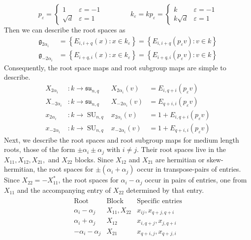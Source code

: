 \documentclass[12pt]{article}
\theoremstyle{definition}
\newcommand{\eps}{\varepsilon}
\newcommand{\lb}{\left\{}
\newcommand{\rb}{\right\}}
\newcommand{\frakg}{\mathfrak{g}}
\newcommand{\fraksu}{\mathfrak{su}}
\DeclareMathOperator{\SU}{SU}
\begin{document}
\[
	p_\eps =
	\begin{cases}
		1 & \eps = -1 \\
		\sqrt{d} & \eps = 1
	\end{cases}
	\qquad \qquad
	k_\eps = k p_\eps = 
	\begin{cases}
		k & \eps = -1 \\
		k \sqrt{d} & \eps = 1
	\end{cases} 
\]
Then we can describe the root spaces as
\begin{align*}
	\frakg_{2\alpha_i} &= \lb E_{i,i+q}(x) : x \in k_\eps \rb = \lb E_{i,i+q}(p_\eps v) : v \in k \rb \\
	\frakg_{-2\alpha_i} &= \lb E_{i+q, i}(x) : x \in k_\eps \rb = \lb E_{i+q,i}(p_\eps v) : v \in k \rb
\end{align*}
Consequently, the root space maps and root subgroup maps are simple to describe.
\begin{align*}
	X_{2\alpha_i}&:k \to \fraksu_{n,q} & X_{2\alpha_i}(v) &= E_{i,q+i}(p_\eps v) \\
	X_{-2\alpha_i}&:k \to \fraksu_{n,q} & X_{-2\alpha_i}(v) &= E_{q+i, i}(p_\eps v) \\
	x_{2\alpha_i}&:k \to \SU_{n,q} & x_{2\alpha_i}(v) &= 1 + E_{i,q+i}(p_\eps v) \\
	x_{-2\alpha_i}&:k \to \SU_{n,q} & x_{-2\alpha_i}(v) &= 1 + E_{q+i,i}(p_\eps v)
\end{align*}
Next, we describe the root spaces and root subgroup maps for medium length roots, those of the form $\pm \alpha_i \pm \alpha_j$ with $i \neq j$. Their root spaces live in the $X_{11}, X_{12}, X_{21},$ and $X_{22}$ blocks. Since $X_{12}$ and $X_{21}$ are hermitian or skew-hermitian, the root spaces for $\pm (\alpha_i + \alpha_j)$ occur in transpose-pairs of entries. Since $X_{22} = - X_{11}^*$, the root spaces for $\alpha_i - \alpha_j$ occur in pairs of entries, one from $X_{11}$ and the accompanying entry of $X_{22}$ determined by that entry.
\begin{align*}
	\begin{array}{c|c|c}
		\text{Root} & \text{Block} &  \text{Specific entries} \\
		\hline
		\alpha_i - \alpha_j & X_{11}, X_{22} & x_{ij}, x_{q+j, q+i} \\
		\alpha_i + \alpha_j & X_{12} & x_{i, q+j}, x_{j, q+i} \\
		-\alpha_i - \alpha_j & X_{21} & x_{q+i, j}, x_{q+j, i}
	\end{array}
\end{align*}
\end{document}
